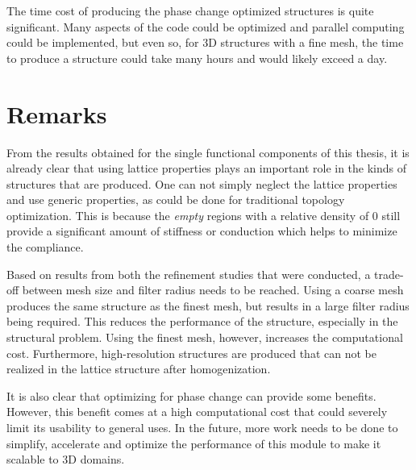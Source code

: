 The time cost of producing the phase change optimized structures is quite significant. Many aspects of the code could be optimized and parallel computing could be implemented, but even so, for 3D structures with a fine mesh, the time to produce a structure could take many hours and would likely exceed a day.


\section{Remarks}
From the results obtained for the single functional components of this thesis, it is already clear that using lattice properties plays an important role in the kinds of structures that are produced. One can not simply neglect the lattice properties and use generic properties, as could be done for traditional topology optimization. This is because the \emph{empty} regions with a relative density of $0$ still provide a significant amount of stiffness or conduction which helps to minimize the compliance.

Based on results from both the refinement studies that were conducted, a trade-off between mesh size and filter radius needs to be reached. Using a coarse mesh produces the same structure as the finest mesh, but results in a large filter radius being required. This reduces the performance of the structure, especially in the structural problem. Using the finest mesh, however, increases the computational cost. Furthermore, high-resolution structures are produced that can not be realized in the lattice structure after homogenization. 

It is also clear that optimizing for phase change can provide some benefits. However, this benefit comes at a high computational cost that could severely limit its usability to general uses. In the future, more work needs to be done to simplify, accelerate and optimize the performance of this module to make it scalable to 3D domains.